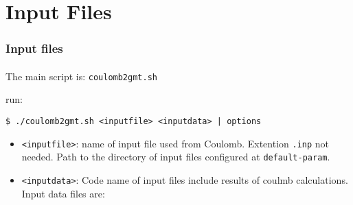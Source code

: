 \section[Inputs]{Input Files}
 
\graphicspath{{Chapter2/Figs/Vector/}{Chapter2/Figs/Raster/}}

\begin{frame}[t,fragile]
  \frametitle{Input files}
  \framesubtitle{}
  \label{fr2:satgeod3}
The main script is: \texttt{coulomb2gmt.sh}

run:

\begin{verbatim}
$ ./coulomb2gmt.sh <inputfile> <inputdata> | options
\end{verbatim}

\begin{itemize}
\item
  \texttt{\textless{}inputfile\textgreater{}}: name of input file used
  from Coulomb. Extention \texttt{.inp} not needed. Path to the
  directory of input files configured at \texttt{default-param}.
\item
  \texttt{\textless{}inputdata\textgreater{}}: Code name of input files
  include results of coulmb calculations. Input data files are:
\end{itemize}
\end{frame}
\note{} %

